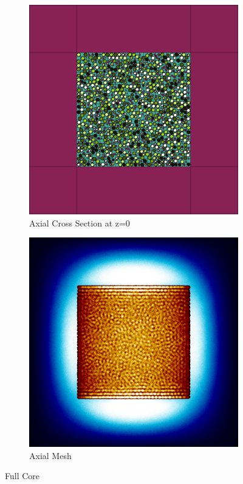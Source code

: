 \begin{figure}[h!]
\begin{subfigure}{0.45\textwidth}
  \includegraphics[width=0.95\linewidth]{figures/control/control-v}
  \caption{Axial Cross Section at z=0 }
  \label{fig:controlc}
\end{subfigure}
%
\begin{subfigure}{0.45\textwidth}
  \includegraphics[width=0.95\linewidth]{figures/control/control-vm}
  \caption{Axial Mesh}
  \label{fig:controld}
\end{subfigure}
%
\caption{Full Core}
\label{fig:control}
\end{figure}